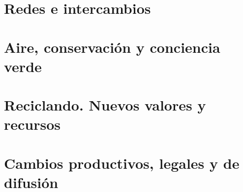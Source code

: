 
%




\part{Redes e intercambios}

\part{Aire, conservación y conciencia verde}

\part{Reciclando. Nuevos valores y recursos}

\part{Cambios productivos, legales y de difusión}


% 


% 

